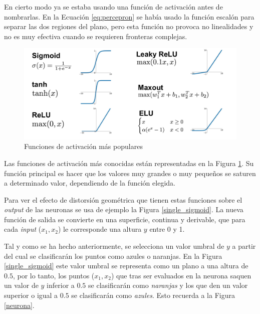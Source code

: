 \begin{itemize}
    En cierto modo ya se estaba usando una función de activación antes de nombrarlas. En la Ecuación \ref{eq:percepron} se había usado la función escalón para separar las dos regiones del plano, pero esta función no provoca no linealidades y no es muy efectiva cuando se requieren fronteras complejas. 
    
    \vspace*{5pt}
    \begin{figure}[h!]
        \centering
        \includegraphics[width=135mm, angle=0]{2/Fotos/activation_functions.png}
        \captionsetup{justification=centering,margin=1.25cm}
        \caption{Funciones de activación más populares}
        \label{activation_functions}
    \end{figure}
    
    Las funciones de activación más conocidas están representadas en la Figura \ref{activation_functions}. Su función principal es hacer que los valores muy grandes o muy pequeños se saturen a determinado valor, dependiendo de la función elegida. 
    
    Para ver el efecto de distorsión geométrica que tienen estas funciones sobre el \textit{output} de las neuronas se usa de ejemplo la Figura \ref{single_sigmoid}. La nueva función de salida se convierte en una superficie, continua y derivable, que para cada \textit{input} ($x_1,x_2$) le corresponde una altura $y$ entre 0 y 1. 
    
    Tal y como se ha hecho anteriormente, se selecciona un valor umbral de $y$ a partir del cual se clasificarán los puntos como azules o naranjas. En la Figura \ref{single_sigmoid} este valor umbral se representa como un plano a una altura de $0.5$, por lo tanto, los puntos ($x_1,x_2$) que tras ser evaluados en la neurona saquen un valor de $y$ inferior a $0.5$ se clasificarán como \textit{naranjas} y los que den un valor superior o igual a $0.5$ se clasificarán como \textit{azules}. Esto recuerda a la Figura \ref{neurona}.


\end{itemize}
